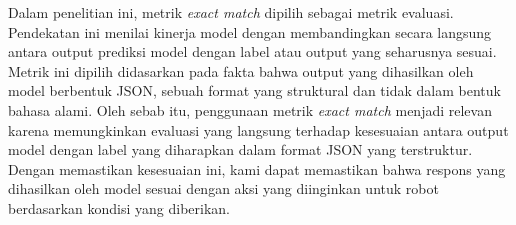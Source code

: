 Dalam penelitian ini, metrik \textit{exact match} dipilih sebagai metrik evaluasi. Pendekatan ini menilai kinerja model dengan membandingkan secara langsung antara output prediksi model dengan label atau output yang seharusnya sesuai. Metrik ini dipilih didasarkan pada fakta bahwa output yang dihasilkan oleh model berbentuk JSON, sebuah format yang struktural dan tidak dalam bentuk bahasa alami. Oleh sebab itu, penggunaan metrik \textit{exact match} menjadi relevan karena memungkinkan evaluasi yang langsung terhadap kesesuaian antara output model dengan label yang diharapkan dalam format JSON yang terstruktur. Dengan memastikan kesesuaian ini, kami dapat memastikan bahwa respons yang dihasilkan oleh model sesuai dengan aksi yang diinginkan untuk robot berdasarkan kondisi yang diberikan.



